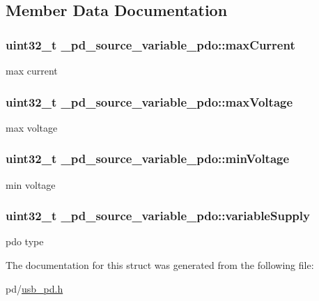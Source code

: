 \subsection{Member Data Documentation}
\hypertarget{struct__pd__source__variable__pdo_a8a24367204d3381f0670311a88c0b2e6}{
\subsubsection[{max\-Current}]{\setlength{\rightskip}{0pt plus 5cm}uint32\-\_\-t \-\_\-pd\-\_\-source\-\_\-variable\-\_\-pdo\-::max\-Current}}\label{struct__pd__source__variable__pdo_a8a24367204d3381f0670311a88c0b2e6}
max current \hypertarget{struct__pd__source__variable__pdo_a493ced8078579d68ade7dfbce819b4d1}{
\subsubsection[{max\-Voltage}]{\setlength{\rightskip}{0pt plus 5cm}uint32\-\_\-t \-\_\-pd\-\_\-source\-\_\-variable\-\_\-pdo\-::max\-Voltage}}\label{struct__pd__source__variable__pdo_a493ced8078579d68ade7dfbce819b4d1}
max voltage \hypertarget{struct__pd__source__variable__pdo_a713018c825f51d1a6a7186582b40a106}{
\subsubsection[{min\-Voltage}]{\setlength{\rightskip}{0pt plus 5cm}uint32\-\_\-t \-\_\-pd\-\_\-source\-\_\-variable\-\_\-pdo\-::min\-Voltage}}\label{struct__pd__source__variable__pdo_a713018c825f51d1a6a7186582b40a106}
min voltage \hypertarget{struct__pd__source__variable__pdo_a47233d0cd3de38e33422b8e107a6ff9d}{
\subsubsection[{variable\-Supply}]{\setlength{\rightskip}{0pt plus 5cm}uint32\-\_\-t \-\_\-pd\-\_\-source\-\_\-variable\-\_\-pdo\-::variable\-Supply}}\label{struct__pd__source__variable__pdo_a47233d0cd3de38e33422b8e107a6ff9d}
pdo type 

The documentation for this struct was generated from the following file\-:\begin{DoxyCompactItemize}
\item 
pd/\hyperlink{usb__pd_8h}{usb\-\_\-pd.\-h}\end{DoxyCompactItemize}
